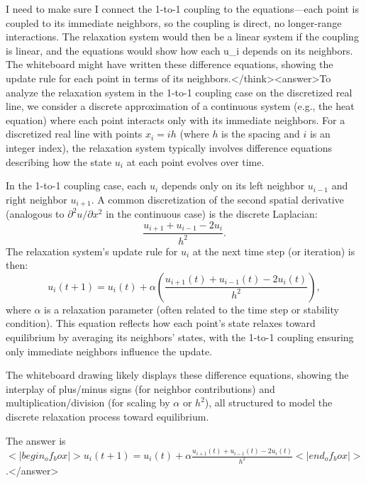 I need to make sure I connect the 1-to-1 coupling to the equations—each point is coupled to its immediate neighbors, so the coupling is direct, no longer-range interactions. The relaxation system would then be a linear system if the coupling is linear, and the equations would show how each u_i depends on its neighbors. The whiteboard might have written these difference equations, showing the update rule for each point in terms of its neighbors.</think><answer>To analyze the relaxation system in the 1-to-1 coupling case on the discretized real line, we consider a discrete approximation of a continuous system (e.g., the heat equation) where each point interacts only with its immediate neighbors. For a discretized real line with points \( x_i = ih \) (where \( h \) is the spacing and \( i \) is an integer index), the relaxation system typically involves difference equations describing how the state \( u_i \) at each point evolves over time.  

In the 1-to-1 coupling case, each \( u_i \) depends only on its left neighbor \( u_{i-1} \) and right neighbor \( u_{i+1} \). A common discretization of the second spatial derivative (analogous to \( \partial^2 u/\partial x^2 \) in the continuous case) is the discrete Laplacian:  
\[
\frac{u_{i+1} + u_{i-1} - 2u_i}{h^2}.
\]  
The relaxation system’s update rule for \( u_i \) at the next time step (or iteration) is then:  
\[
u_i(t+1) = u_i(t) + \alpha \left( \frac{u_{i+1}(t) + u_{i-1}(t) - 2u_i(t)}{h^2} \right),
\]  
where \( \alpha \) is a relaxation parameter (often related to the time step or stability condition). This equation reflects how each point’s state relaxes toward equilibrium by averaging its neighbors’ states, with the 1-to-1 coupling ensuring only immediate neighbors influence the update.  

The whiteboard drawing likely displays these difference equations, showing the interplay of plus/minus signs (for neighbor contributions) and multiplication/division (for scaling by \( \alpha \) or \( h^2 \)), all structured to model the discrete relaxation process toward equilibrium.  

The answer is \(<|begin_of_box|>u_i(t+1) = u_i(t) + \alpha \frac{u_{i+1}(t) + u_{i-1}(t) - 2u_i(t)}{h^2}<|end_of_box|>\).</answer>